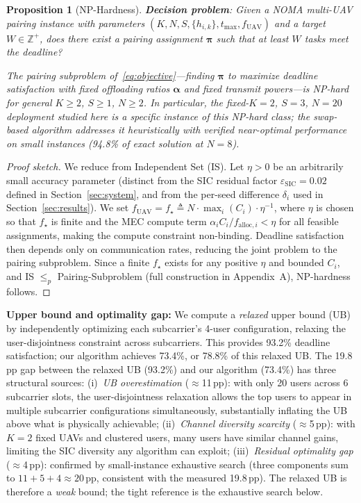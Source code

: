 \documentclass[journal]{IEEEtran}
\newtheorem{proposition}{Proposition}
\begin{document}
\begin{proposition}[NP-Hardness]
\label{prop:nphard}
\textbf{Decision problem}: Given a NOMA multi-UAV pairing instance with parameters $(K, N, S, \{h_{i,k}\}, t_{\max}, f_{\text{UAV}})$ and a target $W \in \mathbb{Z}^+$, does there exist a pairing assignment $\boldsymbol{\pi}$ such that at least $W$ tasks meet the deadline?

The pairing subproblem of~\eqref{eq:objective}---finding $\boldsymbol{\pi}$ to maximize deadline satisfaction with fixed offloading ratios $\boldsymbol{\alpha}$ and fixed transmit powers---is NP-hard for general $K \geq 2$, $S \geq 1$, $N \geq 2$.
In particular, the fixed-$K\!=\!2$, $S\!=\!3$, $N\!=\!20$ deployment studied here is a specific instance of this NP-hard class; the swap-based algorithm addresses it heuristically with verified near-optimal performance on small instances (94.8\% of exact solution at $N\!=\!8$).
\end{proposition}
\begin{proof}[Proof sketch]
We reduce from Independent Set (IS). Let $\eta > 0$ be an arbitrarily small accuracy parameter (distinct from the SIC residual factor $\varepsilon_{\text{SIC}} = 0.02$ defined in Section~\ref{sec:system}, and from the per-seed difference $\delta_i$ used in Section~\ref{sec:results}).
We set $f_{\text{UAV}} = f_{\star} \triangleq N \cdot \max_i(C_i) \cdot \eta^{-1}$, where $\eta$ is chosen so that $f_{\star}$ is finite and the MEC compute term $\alpha_i C_i / f_{\text{alloc},i} < \eta$ for all feasible assignments, making the compute constraint non-binding.
Deadline satisfaction then depends only on communication rates, reducing the joint problem to the pairing subproblem.
Since a finite $f_{\star}$ exists for any positive $\eta$ and bounded $C_i$, and IS $\leq_p$ Pairing-Subproblem (full construction in Appendix~A), NP-hardness follows.
\end{proof}

\textbf{Upper bound and optimality gap:}
We compute a \emph{relaxed} upper bound (UB) by independently optimizing each subcarrier's 4-user configuration, relaxing the user-disjointness constraint across subcarriers.
This provides 93.2\% deadline satisfaction; our algorithm achieves 73.4\%, or 78.8\% of this relaxed UB.
The 19.8\,pp gap between the relaxed UB (93.2\%) and our algorithm (73.4\%) has three structural sources:
(i)~\emph{UB overestimation} ($\approx$11\,pp): with only 20 users across 6 subcarrier slots, the user-disjointness relaxation allows the top users to appear in multiple subcarrier configurations simultaneously, substantially inflating the UB above what is physically achievable;
(ii)~\emph{Channel diversity scarcity} ($\approx$5\,pp): with $K=2$ fixed UAVs and clustered users, many users have similar channel gains, limiting the SIC diversity any algorithm can exploit;
(iii)~\emph{Residual optimality gap} ($\approx$4\,pp): confirmed by small-instance exhaustive search (three components sum to $11+5+4\approx20$\,pp, consistent with the measured 19.8\,pp).
The relaxed UB is therefore a \emph{weak} bound; the tight reference is the exhaustive search below.
\end{document}

